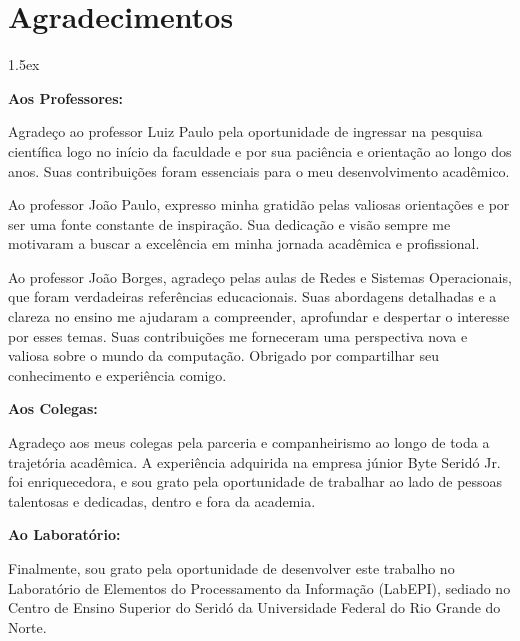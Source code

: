 
\chapter*{Agradecimentos}
\thispagestyle{empty}

\begin{trivlist}  \itemsep 1.5ex

\item \textbf{Aos Professores:}

Agradeço ao professor Luiz Paulo pela oportunidade de ingressar na pesquisa científica logo no início da faculdade e por sua paciência e orientação ao longo dos anos. Suas contribuições foram essenciais para o meu desenvolvimento acadêmico.

Ao professor João Paulo, expresso minha gratidão pelas valiosas orientações e por ser uma fonte constante de inspiração. Sua dedicação e visão sempre me motivaram a buscar a excelência em minha jornada acadêmica e profissional.

Ao professor João Borges, agradeço pelas aulas de Redes e Sistemas Operacionais, que foram verdadeiras referências educacionais. Suas abordagens detalhadas e a clareza no ensino me ajudaram a compreender, aprofundar e despertar o interesse por esses temas. Suas contribuições me forneceram uma perspectiva nova e valiosa sobre o mundo da computação. Obrigado por compartilhar seu conhecimento e experiência comigo.

\item \textbf{Aos Colegas:}

Agradeço aos meus colegas pela parceria e companheirismo ao longo de toda a trajetória acadêmica. A experiência adquirida na empresa júnior Byte Seridó Jr. foi enriquecedora, e sou grato pela oportunidade de trabalhar ao lado de pessoas talentosas e dedicadas, dentro e fora da academia.

\item \textbf{Ao Laboratório:}

Finalmente, sou grato pela oportunidade de desenvolver este trabalho no Laboratório de Elementos do Processamento da Informação (LabEPI), sediado no Centro de Ensino Superior do Seridó da Universidade Federal do Rio Grande do Norte.

\end{trivlist}

